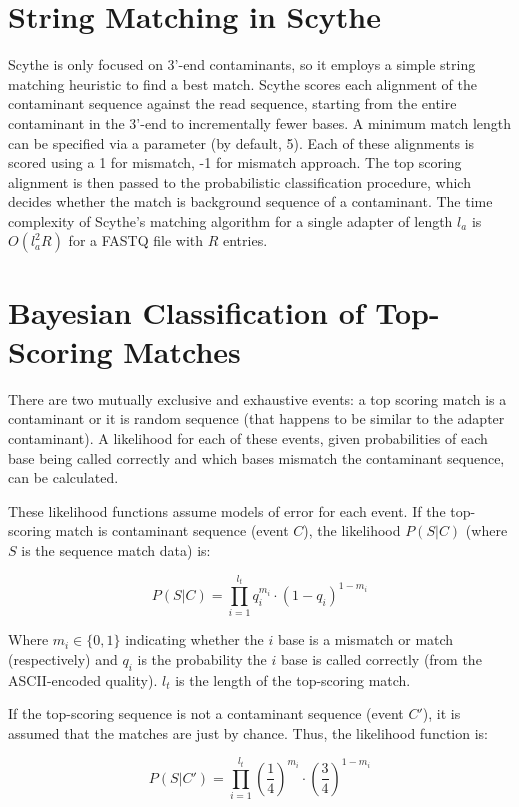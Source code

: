 \documentclass{bioinfo}
\begin{document}
\begin{methods}
\section{String Matching in Scythe}

Scythe is only focused on 3'-end contaminants, so it employs a simple
string matching heuristic to find a best match. Scythe scores each
alignment of the contaminant sequence against the read sequence,
starting from the entire contaminant in the 3'-end to incrementally
fewer bases. A minimum match length can be specified via a parameter
(by default, 5). Each of these alignments is scored using a 1 for
mismatch, -1 for mismatch approach. The top scoring alignment is then
passed to the probabilistic classification procedure, which decides
whether the match is background sequence of a contaminant. The time
complexity of Scythe's matching algorithm for a single adapter of
length $l_a$ is $O(l_a^2 R)$ for a FASTQ file with $R$ entries.


\section{Bayesian Classification of Top-Scoring Matches}

There are two mutually exclusive and exhaustive events: a top scoring
match is a contaminant or it is random sequence (that happens to be
similar to the adapter contaminant). A likelihood for each of these
events, given probabilities of each base being called correctly and
which bases mismatch the contaminant sequence, can be calculated.

These likelihood functions assume models of error for each event. If
the top-scoring match is contaminant sequence (event $C$), the
likelihood $P(S | C)$ (where $S$ is the sequence match data) is:

$$ P(S | C) = \prod_{i=1}^{l_t} q_i^{m_i} \cdot (1-q_i)^{1 - m_i} $$

Where $m_i \in \{0, 1\}$ indicating whether the $i$ base is a mismatch
or match (respectively) and $q_i$ is the probability the $i$ base is
called correctly (from the ASCII-encoded quality). $l_t$ is the length
of the top-scoring match.

If the top-scoring sequence is not a contaminant sequence (event
$C'$), it is assumed that the matches are just by chance. Thus, the
likelihood function is:

$$ P(S | C') = \prod_{i=1}^{l_t} \left(\frac{1}{4}\right)^{m_i} \cdot \left(\frac{3}{4}\right)^{1 - m_i} $$


\end{methods}
\end{document}
